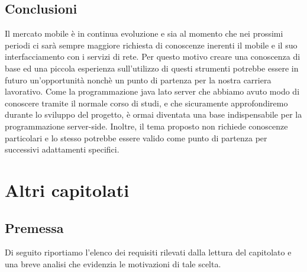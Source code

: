 \subsection{Conclusioni}
Il mercato mobile è in continua evoluzione e sia al momento che nei prossimi periodi ci sarà sempre maggiore richiesta di conoscenze inerenti il mobile e il suo interfacciamento con i servizi di rete. Per questo motivo creare una conoscenza di base ed una piccola esperienza sull'utilizzo di questi strumenti potrebbe essere in futuro un'opportunità nonchè un punto di partenza per la nostra carriera lavorativo. Come la programmazione java lato server che abbiamo avuto modo di conoscere tramite il normale corso di studi, e che sicuramente approfondiremo durante lo sviluppo del progetto, è ormai diventata una base indispensabile per la programmazione server-side. Inoltre, il tema proposto non richiede conoscenze particolari e lo stesso potrebbe essere valido come punto di partenza per successivi adattamenti specifici. \\

\section{Altri capitolati}
\subsection{Premessa}
Di seguito riportiamo l'elenco dei requisiti rilevati dalla lettura del capitolato e una breve analisi che evidenzia le motivazioni di tale scelta.\\
